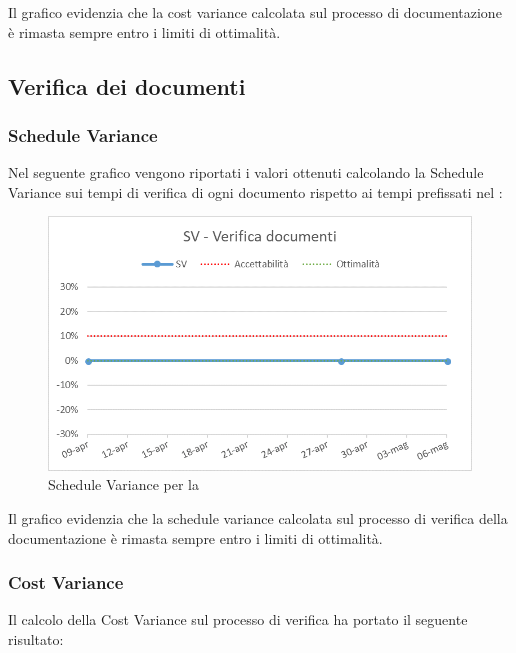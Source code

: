 	Il grafico evidenzia che la cost variance calcolata sul processo di documentazione è rimasta sempre entro i limiti di ottimalità.
	
\subsection{Verifica dei documenti}
\subsubsection{Schedule Variance}
Nel seguente grafico vengono riportati i valori ottenuti calcolando la Schedule Variance sui tempi di verifica di ogni documento rispetto ai tempi prefissati nel \PdP{}:

\begin{figure}[h!]
	\centering
	\includegraphics[scale=0.75]{img/Grafici/SV-VerDocumenti.png}
	\caption{Schedule Variance per la }
	\label{fig:SV-VerDocumenti}
\end{figure}

Il grafico evidenzia che la schedule variance calcolata sul processo di verifica della documentazione è rimasta sempre entro i limiti di ottimalità.


\subsubsection{Cost Variance}
Il calcolo della Cost Variance sul processo di verifica ha portato il seguente risultato: 

